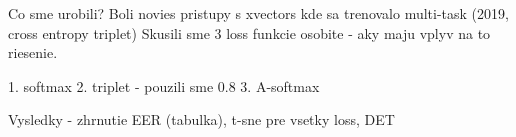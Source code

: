 \noindent
Co sme urobili?
Boli novies pristupy s xvectors kde sa trenovalo multi-task (2019, cross entropy triplet)
Skusili sme 3 loss funkcie osobite - aky maju vplyv na to riesenie.

1. softmax
2. triplet - pouzili sme 0.8
3. A-softmax

Vysledky - zhrnutie EER (tabulka), t-sne pre vsetky loss, DET
